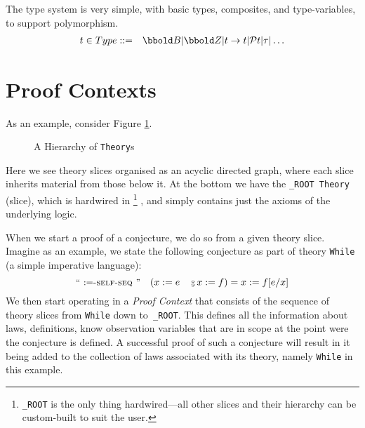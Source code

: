 The type system is very simple, with basic types, composites,
and type-variables, to support polymorphism.
\begin{eqnarray*}
   t \in Type &::=& \Bool | \Int | t \fun t | \power t |  \tau | \ldots
\end{eqnarray*}

\section{Proof Contexts}\label{sec:contexts}

As an example, consider Figure \ref{fig:hier-of-theory}.
\begin{figure}[h]
  \centering
  \caption{A Hierarchy of \texttt{Theory}s}
  \label{fig:hier-of-theory}
\end{figure}
Here we see theory slices organised as an acyclic directed graph,
where each slice inherits material from those below it.
At the bottom we have the \texttt{\_ROOT Theory} (slice),
which is hardwired in%
\footnote{
\texttt{\_ROOT} is the only thing hardwired---all other slices and their hierarchy
can be custom-built to suit the user.
}%
, and simply contains just the axioms of the underlying logic.

When we start a proof of a conjecture,
we do so from a given theory slice.
Imagine as an example, we state the following conjecture as part of theory \texttt{While}
(a simple imperative language):
\[
  \LNAME{$:=$-self-seq}
  \quad
  ( x:= e \comp x := f) =  x := f[e/x]
\]
We then start operating in a \emph{Proof Context} that consists
of the sequence of theory slices from \texttt{While} down to\texttt{ \_ROOT}.
This defines all the information about laws, definitions, know observation variables
that are in scope at the point were the conjecture is defined.
A successful proof of such a conjecture will result in it being added
to the collection of laws associated with its theory,
namely \texttt{While} in this example.

